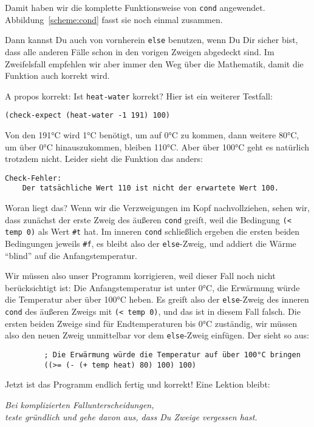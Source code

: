 %
Damit haben wir die komplette Funktionsweise von \texttt{cond}
angewendet. Abbildung~\ref{scheme:cond} fasst sie noch einmal zusammen.

Dann kannst Du auch von vornherein \texttt{else} benutzen, wenn Du Dir
sicher bist, dass alle anderen Fälle schon in den vorigen Zweigen
abgedeckt sind.  Im Zweifelsfall empfehlen wir aber immer den Weg über
die Mathematik, damit die Funktion auch korrekt wird.

A propos korrekt: Ist \texttt{heat-water} korrekt?  Hier ist ein
weiterer Testfall:
%
\begin{verbatim}
(check-expect (heat-water -1 191) 100)
\end{verbatim}
%
Von den 191°C wird 1°C benötigt, um auf 0°C zu kommen, dann weitere
80°C, um über 0°C hinauszukommen, bleiben 110°C.  Aber über 100°C geht
es natürlich trotzdem nicht.  Leider sieht die Funktion das anders:
%
\begin{verbatim}
Check-Fehler:
	Der tatsächliche Wert 110 ist nicht der erwartete Wert 100.
\end{verbatim}
%
Woran liegt das?  Wenn wir die Verzweigungen im Kopf nachvollziehen,
sehen wir, dass zunächst der erste Zweig des äußeren \texttt{cond}
greift, weil die Bedingung \verb|(< temp 0)| als Wert \verb|#t| hat.
Im inneren \texttt{cond} schließlich ergeben die ersten beiden
Bedingungen jeweils \verb|#f|, es bleibt also der \texttt{else}-Zweig,
und addiert die Wärme "`blind"' auf die Anfangstemperatur.

Wir müssen also unser Programm korrigieren, weil dieser Fall noch
nicht berücksichtigt ist: Die Anfangstemperatur ist unter 0°C, die
Erwärmung würde die Temperatur aber über 100°C heben.  Es greift also
der \texttt{else}-Zweig des inneren \texttt{cond} des äußeren Zweigs
mit \texttt{(< temp 0)}, und das ist in diesem Fall falsch.  Die
ersten beiden Zweige sind für Endtemperaturen bis 0°C zuständig, wir
müssen also den neuen Zweig unmittelbar vor dem \texttt{else}-Zweig
einfügen.  Der sieht so aus:
%
\begin{verbatim}
         ; Die Erwärmung würde die Temperatur auf über 100°C bringen
         ((>= (- (+ temp heat) 80) 100) 100)
\end{verbatim}
%
Jetzt ist das Programm endlich fertig und korrekt! Eine Lektion bleibt:
%
\begin{center}
  \emph{Bei komplizierten Fallunterscheidungen,\\ teste gründlich und
    gehe davon aus, dass Du Zweige vergessen hast.}
\end{center}

